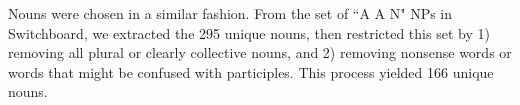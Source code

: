 \documentclass[12pt]{article}
\newcommand{\ndg}[1]{\textcolor{Green}{[ndg: #1]}}
\begin{document}
Nouns were chosen in a similar fashion. From the set of ``A A N" NPs in Switchboard, we extracted the 295 unique nouns, then restricted this set by 1) removing all plural or clearly collective nouns, and 2) removing nonsense words or words that might be confused with participles. This process yielded 166 unique nouns. %



 

\end{document}
